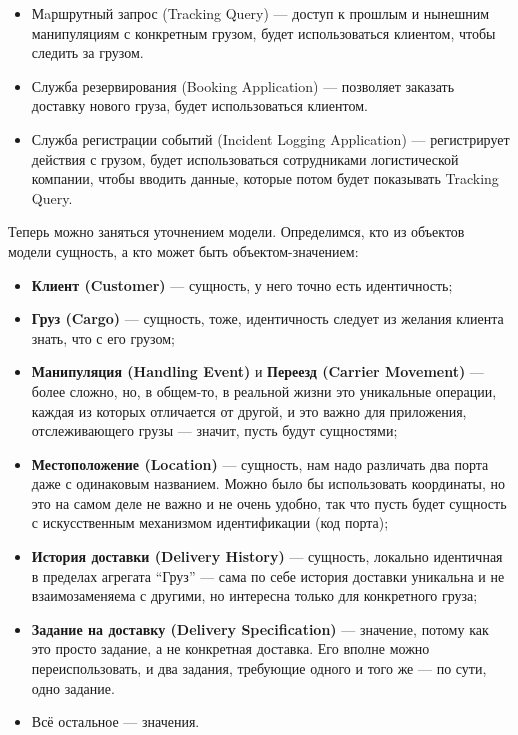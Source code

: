 \documentclass{../../text-style}
\begin{document}
\begin{itemize}
    \item Мaршрутный запрос (Tracking Query) --- доступ к прошлым и нынешним манипуляциям с конкретным грузом, будет использоваться клиентом, чтобы следить за грузом.
    \item Служба резервирования (Booking Application) --- позволяет заказать доставку нового груза, будет использоваться клиентом.
    \item Служба регистрации событий (Incident Logging Application) --- регистрирует действия с грузом, будет использоваться сотрудниками логистической компании, чтобы вводить данные, которые потом будет показывать Tracking Query.
\end{itemize}

Теперь можно заняться уточнением модели. Определимся, кто из объектов модели сущность, а кто может быть объектом-значением:

\begin{itemize}
    \item \textbf{Клиент (Customer)} --- сущность, у него точно есть идентичность;
    \item \textbf{Груз (Cargo)} --- сущность, тоже, идентичность следует из желания клиента знать, что с его грузом;
    \item \textbf{Манипуляция (Handling Event)} и \textbf{Переезд (Carrier Movement)} --- более сложно, но, в общем-то, в реальной жизни это уникальные операции, каждая из которых отличается от другой, и это важно для приложения, отслеживающего грузы --- значит, пусть будут сущностями;
    \item \textbf{Местоположение (Location)} --- сущность, нам надо различать два порта даже с одинаковым названием. Можно было бы использовать координаты, но это на самом деле не важно и не очень удобно, так что пусть будет сущность с искусственным механизмом идентификации (код порта);
    \item \textbf{История доставки (Delivery History)} --- сущность, локально идентичная в пределах агрегата ``Груз'' --- сама по себе история доставки уникальна и не взаимозаменяема с другими, но интересна только для конкретного груза;
    \item \textbf{Задание на доставку (Delivery Specification)} --- значение, потому как это просто задание, а не конкретная доставка. Его вполне можно переиспользовать, и два задания, требующие одного и того же --- по сути, одно задание.
    \item Всё остальное --- значения.
\end{itemize}
\end{document}
